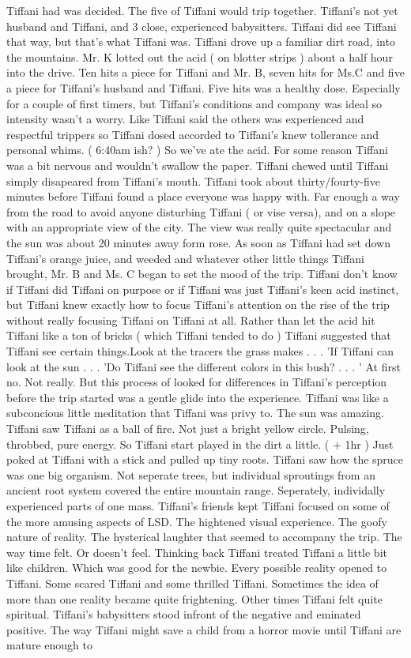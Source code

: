 \documentclass[12pt]{book}
\begin{document}
Tiffani had was decided. The five of Tiffani would trip together. Tiffani's not yet husband and Tiffani, and 3 close, experienced babysitters. Tiffani did see Tiffani that way, but that's what Tiffani was. Tiffani drove up a familiar dirt road, into the mountains. Mr. K lotted out the acid ( on blotter strips ) about a half hour into the drive. Ten hits a piece for Tiffani and Mr. B, seven hits for Ms.C and five a piece for Tiffani's husband and Tiffani. Five hits was a healthy dose. Especially for a couple of first timers, but Tiffani's conditions and company was ideal so intensity wasn't a worry. Like Tiffani said the others was experienced and respectful trippers so Tiffani dosed accorded to Tiffani's knew tollerance and personal whims. ( 6:40am ish? ) So we've ate the acid. For some reason Tiffani was a bit nervous and wouldn't swallow the paper. Tiffani chewed until Tiffani simply disapeared from Tiffani's mouth. Tiffani took about thirty/fourty-five minutes before Tiffani found a place everyone was happy with. Far enough a way from the road to avoid anyone disturbing Tiffani ( or vise versa), and on a slope with an appropriate view of the city. The view was really quite spectacular and the sun was about 20 minutes away form rose. As soon as Tiffani had set down Tiffani's orange juice, and weeded and whatever other little things Tiffani brought, Mr. B and Ms. C began to set the mood of the trip. Tiffani don't know if Tiffani did Tiffani on purpose or if Tiffani was just Tiffani's keen acid instinct, but Tiffani knew exactly how to focus Tiffani's attention on the rise of the trip without really focusing Tiffani on Tiffani at all. Rather than let the acid hit Tiffani like a ton of bricks ( which Tiffani tended to do ) Tiffani suggested that Tiffani see certain things.Look at the tracers the grass makes . . .  'If Tiffani can look at the sun . . .  'Do Tiffani see the different colors in this bush? . . .  ' At first no. Not really. But this process of looked for differences in Tiffani's perception before the trip started was a gentle glide into the experience. Tiffani was like a subconcious little meditation that Tiffani was privy to. The sun was amazing. Tiffani saw Tiffani as a ball of fire. Not just a bright yellow circle. Pulsing, throbbed, pure energy. So Tiffani start played in the dirt a little. ( + 1hr ) Just poked at Tiffani with a stick and pulled up tiny roots. Tiffani saw how the spruce was one big organism. Not seperate trees, but individual sproutings from an ancient root system covered the entire mountain range. Seperately, individally experienced parts of one mass. Tiffani's friends kept Tiffani focused on some of the more amusing aspects of LSD. The hightened visual experience. The goofy nature of reality. The hysterical laughter that seemed to accompany the trip. The way time felt. Or doesn't feel. Thinking back Tiffani treated Tiffani a little bit like children. Which was good for the newbie. Every possible reality opened to Tiffani. Some scared Tiffani and some thrilled Tiffani. Sometimes the idea of more than one reality became quite frightening. Other times Tiffani felt quite spiritual. Tiffani's babysitters stood infront of the negative and eminated positive. The way Tiffani might save a child from a horror movie until Tiffani are mature enough to 
\end{document}
